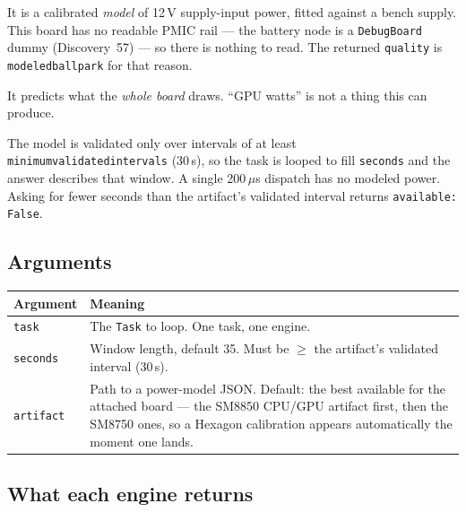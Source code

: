 \documentclass[11pt,a4paper]{article}
\newcommand{\code}[1]{\texttt{\let\_\breakableunderscore #1}}
\newcommand{\breakableunderscore}{\textunderscore\allowbreak}
\newcommand{\us}{$\mu$s}
\begin{document}
\begin{description}[leftmargin=1.2cm,style=nextline,font=\normalfont\itshape]
  \item[Not a measurement.] It is a calibrated \emph{model} of 12\,V
    supply-input power, fitted against a bench supply. This board has no
    readable PMIC rail --- the battery node is a \code{Debug\_Board} dummy
    (Discovery~57) --- so there is nothing to read. The returned
    \code{quality} is \code{modeled\_ballpark} for that reason.
  \item[Not per-engine.] It predicts what the \emph{whole board} draws.
    ``GPU watts'' is not a thing this can produce.
  \item[Not per-dispatch.] The model is validated only over intervals of at
    least \code{minimum\_validated\_interval\_s} (30\,s), so the task is looped
    to fill \code{seconds} and the answer describes that window. A single
    200\,\us{} dispatch has no modeled power. Asking for fewer seconds than the
    artifact's validated interval returns \code{available: False}.
\end{description}

\subsection{Arguments}

\begin{longtable}{@{}p{2.3cm}p{12.4cm}@{}}
\toprule
\textbf{Argument} & \textbf{Meaning} \\
\midrule
\endhead
\code{task} & The \code{Task} to loop. One task, one engine. \\
\code{seconds} & Window length, default 35. Must be $\geq$ the artifact's
  validated interval (30\,s). \\
\code{artifact} & Path to a power-model JSON. Default: the best available for
  the attached board --- the SM8850 CPU/GPU artifact first, then the SM8750
  ones, so a Hexagon calibration appears automatically the moment one lands. \\
\bottomrule
\end{longtable}

\subsection{What each engine returns}
\end{document}

